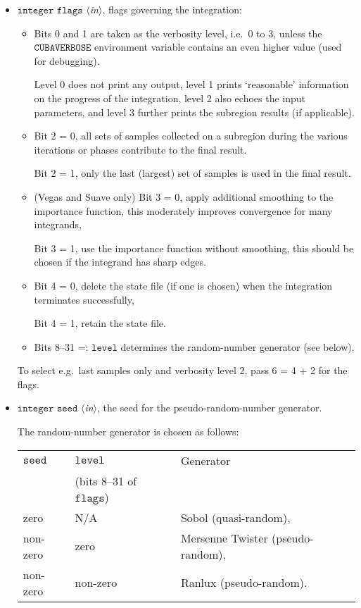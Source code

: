 \documentclass[12pt]{article}
\newcommand\ie{i.e.\ }
\newcommand\eg{e.g.\ }
\newcommand\Code[1]{\ensuremath{\texttt{#1}}}
\newcommand\VarIn[1]{\item\Code{#1} \textit{$\langle$in\/$\rangle$},}
\begin{document}
\begin{itemize}
\VarIn{integer flags}
flags governing the integration:
\begin{itemize}
\item Bits 0 and 1 are taken as the verbosity level, \ie 0 to 3, 
unless the \Code{CUBAVERBOSE} environment variable contains an even
higher value (used for debugging).

Level 0 does not print any output, level 1 prints `reasonable'
information on the progress of the integration, level 2 also echoes the
input parameters, and level 3 further prints the subregion results (if
applicable).

\item Bit 2 = 0,
all sets of samples collected on a subregion during the various 
iterations or phases contribute to the final result.

Bit 2 = 1,
only the last (largest) set of samples is used in the final result.

\item (Vegas and Suave only) Bit 3 = 0,
apply additional smoothing to the importance function, this moderately
improves convergence for many integrands,

Bit 3 = 1,
use the importance function without smoothing, this should be chosen if 
the integrand has sharp edges.

\item Bit 4 = 0,
delete the state file (if one is chosen) when the integration terminates 
successfully,

Bit 4 = 1,
retain the state file.

\item Bits 8--31 =: \Code{level} determines the random-number generator
(see below).
\end{itemize}

To select \eg last samples only and verbosity level 2, pass 6 = 4 + 2
for the flags.

\VarIn{integer seed}
the seed for the pseudo-random-number generator.

The random-number generator is chosen as follows:
\begin{center}
\begin{tabular}{l|l|l}
\Code{seed} & \Code{level} & Generator \\
& {\small (bits 8--31 of \Code{flags})} & \\ \hline
zero & N/A & Sobol (quasi-random), \\
non-zero & zero & Mersenne Twister (pseudo-random), \\
non-zero & non-zero & Ranlux (pseudo-random).
\end{tabular}
\end{center}


\end{itemize}
\end{document}
